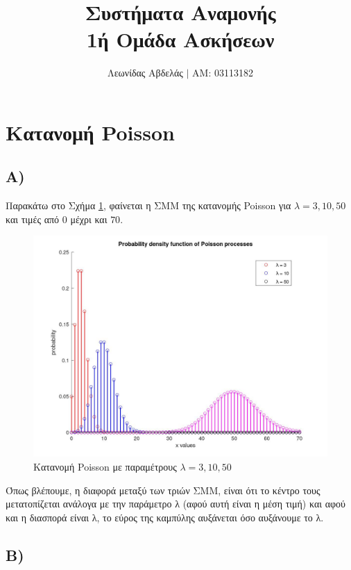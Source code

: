 \documentclass{article}
\title{Συστήματα Αναμονής \\
    1ή Ομάδα Ασκήσεων}
\newcommand{\english}[1]{\foreignlanguage{english}{{#1}}}
\begin{document}
\date{}
\author{Λεωνίδας Αβδελάς $|$ ΑΜ: 03113182}

\maketitle

\section*{Κατανομή \english{Poisson}}

\subsection*{Α)}

Παρακάτω στο Σχήμα \ref{fig:poissonA}, φαίνεται η ΣΜΜ της κατανομής \english{Poisson} για $λ = {3, 10, 50}$ και τιμές από $0$ μέχρι και $70$.

\begin{figure}
    \centering
    \includegraphics[width=\textwidth]{poissonA.jpg}
    \caption{Κατανομή \english{Poisson} με παραμέτρους $λ = {3, 10, 50}$}
    \label{fig:poissonA}
\end{figure}

Όπως βλέπουμε, η διαφορά μεταξύ των τριών ΣΜΜ, είναι ότι το κέντρο τους μετατοπίζεται ανάλογα με την παράμετρο λ (αφού αυτή είναι η μέση τιμή) και αφού και η διασπορά είναι λ, το εύρος της καμπύλης αυξάνεται όσο αυξάνουμε το λ.

\subsection*{Β)}
\end{document}
